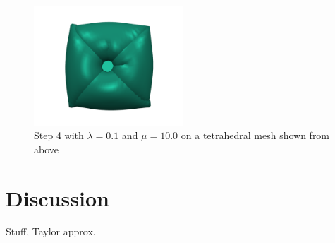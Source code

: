 \begin{figure}[!htbp]
	\centering
	\includegraphics[width=0.5\textwidth]{resources/mu_extreme_1.png}
	\caption{Step 4 with $\lambda = 0.1$ and $\mu = 10.0$ on a tetrahedral mesh shown from above}
	\label{fig:mu_extreme}
\end{figure}


\newpage

\section{Discussion}
Stuff, Taylor approx.



